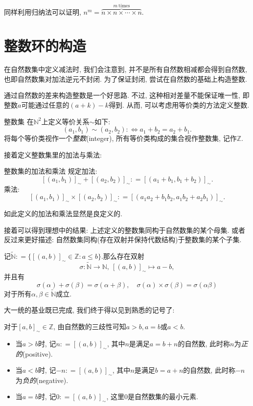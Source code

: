 同样利用归纳法可以证明, $n^m = \overbrace{n\times n\times \cdots \times n}^{m~ \text{times}}$.


\newpage
\section{整数环的构造}

在自然数集中定义减法时, 我们会注意到, 并不是所有自然数相减都会得到自然数, 也即自然数集对加法逆元不封闭. 为了保证封闭, 尝试在自然数的基础上构造整数.

通过自然数的差来构造整数是一个好思路. 不过, 这种相对差量不能保证唯一性, 即整数$a$可能通过任意的$(a+k)-k$得到. 从而, 可以考虑用等价类的方法定义整数. 

\begin{definition}{整数集}
	在$\mathbb{N}^2$上定义等价关系$\sim$如下: $$(a_1, b_1) \sim (a_2, b_2) : \Leftrightarrow a_1+b_2=a_2+b_1.$$
	将每个等价类视作一个\textit{整数}(integer), 所有等价类构成的集合视作整数集, 记作$\mathbb{Z}$.
\end{definition}

接着定义整数集里的加法与乘法: 

\begin{definition}{整数集的加法和乘法}
	规定加法: $$[(a_1, b_1)]_{\sim} + [(a_2, b_2)]_{\sim} : = [(a_1+b_1, b_1+b_2)]_{\sim}.$$
	乘法: 
	$$[(a_1, b_1)]_{\sim} \times [(a_2, b_2)]_{\sim} : = [(a_1a_2+b_1b_2, a_1b_2+a_2b_1)]_{\sim}.$$
\end{definition}

如此定义的加法和乘法显然是良定义的. 

接着可以得到理想中的结果: 上述定义的整数集同构于自然数集的某个母集. 或者反过来更好描述: 自然数集同构(存在双射并保持代数结构)于整数集的某个子集. 

\begin{proposition}{}
	记$\tilde{\mathbb{N}}: =\{ [(a, b)]_{\sim} \in \mathbb{Z}: a \leq b \}$.那么存在双射$$\sigma : \tilde{\mathbb{N}} \to \mathbb{N}, ~[(a, b)]_{\sim} \mapsto a-b, $$
	并且有$$\sigma (\alpha) + \sigma (\beta) = \sigma (\alpha + \beta), \quad \sigma (\alpha) \times \sigma (\beta) = \sigma (\alpha  \beta)$$
	对于所有$\alpha , \beta \in \tilde{\mathbb{N}}$成立.
\end{proposition}

大一统的基业既已完成, 我们终于得以见到熟悉的记号了: 

\begin{definition}{}
	对于$[a, b]_{\sim} \in \mathbb{Z}$, 由自然数的三歧性可知$a>b, a=b$或$a<b$. 
	\begin{itemize}
		\item 当$a>b$时, 记$n: =[(a, b)]_{\sim}$, 其中$n$是满足$a=b+n$的自然数, 此时称$n$为\textit{正的}(positive). 
		\item 当$a<b$时, 记$-n: =[(a, b)]_{\sim}$, 其中$n$是满足$b=a+n$的自然数, 此时称$-n$为\textit{负的}(negative). 
		\item 当$a=b$时, 记$0: =[(a, b)]_{\sim}$, 这里$0$是自然数集的最小元素.
	\end{itemize}
\end{definition}

